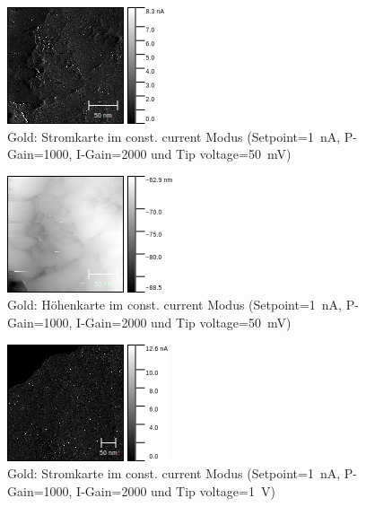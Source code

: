 \documentclass[sn-mathphys-num,iicol]{sn-jnl}
\theoremstyle{thmstyleone}
\theoremstyle{thmstyletwo}
\theoremstyle{thmstylethree}
\begin{document}
\begin{figure}[h]
        \centering
        \includegraphics[width=.5\textwidth]{../data/Gold_200nm_50mV_current.png}
        \caption{Gold: Stromkarte im const. current Modus (Setpoint=\SI{1}{\nano A}, P-Gain=\SI{1000}{}, I-Gain=\SI{2000}{} und Tip voltage=\SI{50}{\milli V})} \label{fig:g200nm50mVc}
\end{figure}
\begin{figure}[h]
        \centering
        \includegraphics[width=.5\textwidth]{../data/Gold_200nm_50mV_z.png}
        \caption{Gold: Höhenkarte im const. current Modus (Setpoint=\SI{1}{\nano A}, P-Gain=\SI{1000}{}, I-Gain=\SI{2000}{} und Tip voltage=\SI{50}{\milli V})} \label{fig:g200nm50mVz}
\end{figure}
\begin{figure}[h]
        \centering
        \includegraphics[width=.5\textwidth]{../data/Gold_400nm_current.png}
        \caption{Gold: Stromkarte im const. current Modus (Setpoint=\SI{1}{\nano A}, P-Gain=\SI{1000}{}, I-Gain=\SI{2000}{} und Tip voltage=\SI{1}{V})} \label{fig:g400nmc}
\end{figure}
\end{document}
